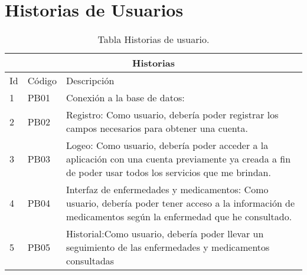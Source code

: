 \chapter{Historias de Usuarios}


\begin{table}[htb]
	\centering
	\begin{tabular}{|l|p{2cm}|p{10cm}|}
		\hline
		\multicolumn{3}{|c|}{Historias} \\ \hline
		Id & Código & Descripción \\
		\hline \hline
		1 & PB01  &  Conexión a la base de datos:  \\ \hline
		2 & PB02  & Registro: Como usuario, debería poder registrar los campos necesarios para obtener una cuenta. \\ \hline
		3 & PB03  & Logeo: Como usuario, debería poder acceder a la aplicación con una cuenta previamente ya creada a fin de poder usar todos los servicios que me brindan.   \\ \hline
		
		4 & PB04 & Interfaz de enfermedades y medicamentos: 
		Como usuario, debería poder tener acceso a la información de medicamentos según la enfermedad que he consultado.  \\ \hline
		5 & PB05  & Historial:Como usuario, debería poder llevar un seguimiento de las enfermedades y medicamentos consultadas\\ \hline
	\end{tabular}
	\caption{Tabla Historias de usuario.}
	\label{tabla:Historial}
\end{table}